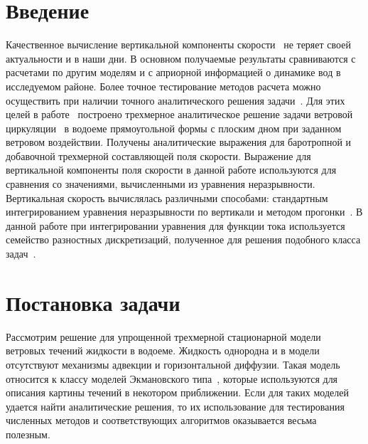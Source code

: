 \documentclass[press]{vestnik}
\begin{document}
\date{27-05-2024}

\maketitle

\section*{Введение}

Качественное вычисление вертикальной компоненты скорости~\cite{B01} не теряет 
своей актуальности и в наши дни. В основном получаемые результаты 
сравниваются с расчетами по другим моделям и с априорной информацией о 
динамике вод в исследуемом районе. Более точное тестирование методов расчета 
можно осуществить при наличии точного аналитического решения задачи~\cite{B02}. Для 
этих целей в работе~\cite{B03} построено трехмерное аналитическое решение задачи 
ветровой циркуляции~\cite{B04,B05} в водоеме прямоугольной формы с плоским дном при 
заданном ветровом воздействии. Получены аналитические выражения для 
баротропной и добавочной трехмерной составляющей поля скорости. Выражение 
для вертикальной компоненты поля скорости в данной работе используются для 
сравнения со значениями, вычисленными из уравнения неразрывности. 
Вертикальная скорость вычислялась различными способами: стандартным 
интегрированием уравнения неразрывности по вертикали и методом прогонки~\cite{B06}. 
В данной работе при интегрировании уравнения для функции тока используется 
семейство разностных дискретизаций, полученное для решения подобного класса 
задач~\cite{B07}. 

\section{Постановка задачи}

Рассмотрим решение для упрощенной трехмерной 
стационарной модели ветровых течений жидкости в водоеме. Жидкость однородна 
и в модели отсутствуют механизмы адвекции и горизонтальной диффузии. Такая 
модель относится к классу моделей Экмановского типа~\cite{B08}, которые 
используются для описания картины течений в некотором приближении. Если для 
таких моделей удается найти аналитические решения, то их использование для 
тестирования численных методов и соответствующих алгоритмов оказывается 
весьма полезным.
\end{document}
